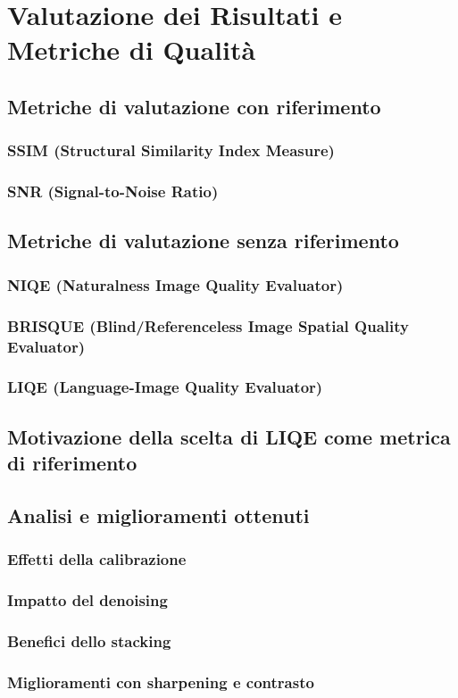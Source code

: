 \chapter{Valutazione dei Risultati e Metriche di Qualità} \label{chap:evaluation}

\section{Metriche di valutazione con riferimento}

\subsection{SSIM (Structural Similarity Index Measure)}

\subsection{SNR (Signal-to-Noise Ratio)}

\section{Metriche di valutazione senza riferimento}

\subsection{NIQE (Naturalness Image Quality Evaluator)}

\subsection{BRISQUE (Blind/Referenceless Image Spatial Quality Evaluator)}

\subsection{LIQE (Language-Image Quality Evaluator)}

\section{Motivazione della scelta di LIQE come metrica di riferimento}

\section{Analisi e miglioramenti ottenuti}

\subsection{Effetti della calibrazione}

\subsection{Impatto del denoising}

\subsection{Benefici dello stacking}

\subsection{Miglioramenti con sharpening e contrasto}

\cleardoublepage